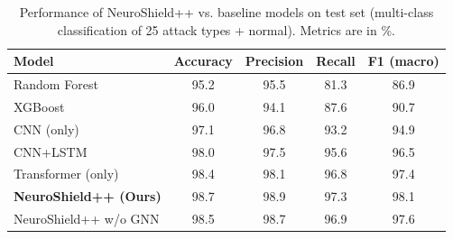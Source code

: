 \begin{table}[t]
\centering
\caption{Performance of NeuroShield++ vs. baseline models on test set (multi-class classification of 25 attack types + normal). Metrics are in \%.}
\label{tab:performance_comparison}
\begin{tabular}{lcccc}
\hline
\textbf{Model} & \textbf{Accuracy} & \textbf{Precision} & \textbf{Recall} & \textbf{F1 (macro)} \\
\hline
Random Forest & 95.2 & 95.5 & 81.3 & 86.9 \\
XGBoost & 96.0 & 94.1 & 87.6 & 90.7 \\
CNN (only) & 97.1 & 96.8 & 93.2 & 94.9 \\
CNN+LSTM & 98.0 & 97.5 & 95.6 & 96.5 \\
Transformer (only) & 98.4 & 98.1 & 96.8 & 97.4 \\
\textbf{NeuroShield++ (Ours)} & 98.7 & 98.9 & 97.3 & 98.1 \\
NeuroShield++ w/o GNN & 98.5 & 98.7 & 96.9 & 97.6 \\
\hline
\end{tabular}
\end{table}